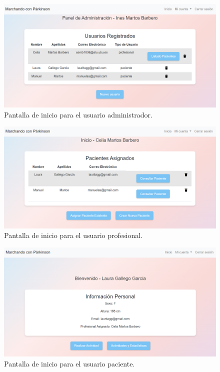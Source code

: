\begin{figure}[h]
    \centering
    \includegraphics[width=1\textwidth]{img/B3_Manual/InicioAdmin.png}
    \caption{Pantalla de inicio para el usuario administrador.}
    \label{fig:InicioAdmin}
\end{figure}

\begin{figure}[h]
    \centering
    \includegraphics[width=1\textwidth]{img/B3_Manual/InicioProf.png}
    \caption{Pantalla de inicio para el usuario profesional.}
    \label{fig:InicioProf}
\end{figure}
    
\begin{figure}[h]
    \centering
    \includegraphics[width=1\textwidth]{img/B3_Manual/InicioPaciente.png}
    \caption{Pantalla de inicio para el usuario paciente.}
    \label{fig:InicioPaciente}
\end{figure}

